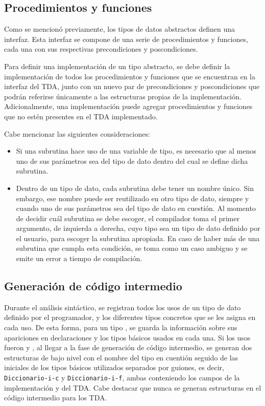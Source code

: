 {{\subsection{Procedimientos y funciones}

Como se mencionó previamente, los tipos de datos abstractos definen una
interfaz. Esta interfaz se compone de una serie de procedimientos y funciones,
cada una con sus respectivas precondiciones y poscondiciones.

Para definir una implementación de un tipo abstracto, se debe definir la
implementación de todos los procedimientos y funciones que se encuentran en la
interfaz del TDA, junto con un nuevo par de precondiciones y poscondiciones que
podrán referirse únicamente a las estructuras propias de la implementación.
Adicionalmente, una implementación puede agregar procedimientos y funciones que
no estén presentes en el TDA implementado.

Cabe mencionar las siguientes consideraciones:

\begin{itemize}

  \item Si una subrutina hace uso de una variable de tipo, es necesario que al
  menos uno de sus parámetros sea del tipo de dato dentro del cual se define
  dicha subrutina.

  \item Dentro de un tipo de dato, cada subrutina debe tener un nombre único.
  Sin embargo, ese nombre puede ser reutilizado en otro tipo de dato, siempre y
  cuando uno de sus parámetros sea del tipo de dato en cuestión. Al momento de
  decidir cuál subrutina se debe escoger, el compilador toma el primer
  argumento, de izquierda a derecha, cuyo tipo sea un tipo de dato definido por
  el usuario, para escoger la subrutina apropiada. En caso de haber más de una
  subrutina que cumpla esta condición, se toma como un caso ambiguo y se emite
  un error a tiempo de compilación.

\end{itemize}

\subsection{Generación de código intermedio}

Durante el análisis sintáctico, se registran todos los usos de un tipo de dato
definido por el programador, y los diferentes tipos concretos que se les asigna
en cada uso. De esta forma, para un tipo , se guarda
la información sobre sus apariciones en declaraciones y los tipos básicos usados
en cada una. Si los usos fueron  y
, al llegar a la fase de generación de código
intermedio, se generan dos estructuras de bajo nivel con el nombre del tipo en
cuentión seguido de las iniciales de los tipos básicos utilizados separados por
guiones, es decir, \texttt{Diccionario-i-c} y \texttt{Diccionario-i-f}, ambas
conteniendo los campos de la implementación y del TDA. Cabe destacar que nunca
se generan estructuras en el código intermedio para los TDA.

}}
